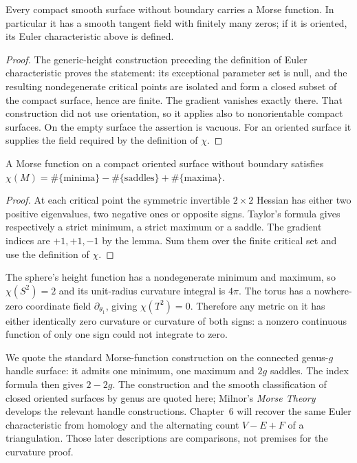 \begin{theorem}\label{thm:morseexists}
Every compact smooth surface without boundary carries a Morse function. In particular it has a smooth tangent field with finitely many zeros; if it is oriented, its Euler characteristic above is defined.
\end{theorem}

\begin{proof}
The generic-height construction preceding the definition of Euler characteristic proves the statement: its exceptional parameter set is null, and the resulting nondegenerate critical points are isolated and form a closed subset of the compact surface, hence are finite. The gradient vanishes exactly there. That construction did not use orientation, so it applies also to nonorientable compact surfaces. On the empty surface the assertion is vacuous. For an oriented surface it supplies the field required by the definition of $\chi$.
\end{proof}

\begin{corollary}\label{cor:chimorse}
A Morse function on a compact oriented surface without boundary satisfies
$\chi(M)=\#\{\text{minima}\}-\#\{\text{saddles}\}+\#\{\text{maxima}\}$.
\end{corollary}

\begin{proof}
At each critical point the symmetric invertible $2\times2$ Hessian has either two positive eigenvalues, two negative ones or opposite signs. Taylor's formula gives respectively a strict minimum, a strict maximum or a saddle. The gradient indices are $+1,+1,-1$ by the lemma. Sum them over the finite critical set and use the definition of $\chi$.
\end{proof}

\begin{example}\label{ex:chiexamples}
The sphere's height function has a nondegenerate minimum and maximum, so $\chi(S^2)=2$ and its unit-radius curvature integral is $4\pi$. The torus has a nowhere-zero coordinate field $\partial_{\theta_1}$, giving $\chi(T^2)=0$. Therefore any metric on it has either identically zero curvature or curvature of both signs: a nonzero continuous function of only one sign could not integrate to zero.

We quote the standard Morse-function construction on the connected genus-$g$ handle surface: it admits one minimum, one maximum and $2g$ saddles. The index formula then gives $2-2g$. The construction and the smooth classification of closed oriented surfaces by genus are quoted here; Milnor's \emph{Morse Theory} develops the relevant handle constructions. Chapter~6 will recover the same Euler characteristic from homology and the alternating count $V-E+F$ of a triangulation. Those later descriptions are comparisons, not premises for the curvature proof.
\end{example}

